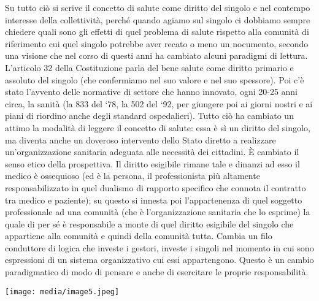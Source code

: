 \documentclass[]{article}
\begin{document}
Su tutto ciò si scrive il concetto di salute come diritto del singolo e
nel contempo interesse della collettività, perché quando agiamo sul
singolo ci dobbiamo sempre chiedere quali sono gli effetti di quel
problema di salute rispetto alla comunità di riferimento cui quel
singolo potrebbe aver recato o meno un nocumento, secondo una visione
che nel corso di questi anni ha cambiato alcuni paradigmi di lettura.
L'articolo 32 della Costituzione parla del bene salute come diritto
primario e assoluto del singolo (che confermiamo nel suo valore e nel
suo spessore). Poi c'è stato l'avvento delle normative di settore che
hanno innovato, ogni 20-25 anni circa, la sanità (la 833 del `78, la 502
del `92, per giungere poi ai giorni nostri e ai piani di riordino anche
degli standard ospedalieri). Tutto ciò ha cambiato un attimo la modalità
di leggere il concetto di salute: essa è sì un diritto del singolo, ma
diventa anche un doveroso intervento dello Stato diretto a realizzare
un'organizzazione sanitaria adeguata alle necessità dei cittadini. È
cambiato il senso etico della prospettiva. Il diritto esigibile rimane
tale e dinanzi ad esso il medico è ossequioso (ed è la persona, il
professionista più altamente responsabilizzato in quel dualismo di
rapporto specifico che connota il contratto tra medico e paziente); su
questo si innesta poi l'appartenenza di quel soggetto professionale ad
una comunità (che è l'organizzazione sanitaria che lo esprime) la quale
di per sé è responsabile a monte di quel diritto esigibile del singolo
che appartiene alla comunità e quindi della comunità tutta. Cambia un
filo conduttore di logica che investe i gestori, investe i singoli nel
momento in cui sono espressioni di un sistema organizzativo cui essi
appartengono. Questo è un cambio paradigmatico di modo di pensare e
anche di esercitare le proprie responsabilità.

\texttt{[image: media/image5.jpeg]}
\end{document}
